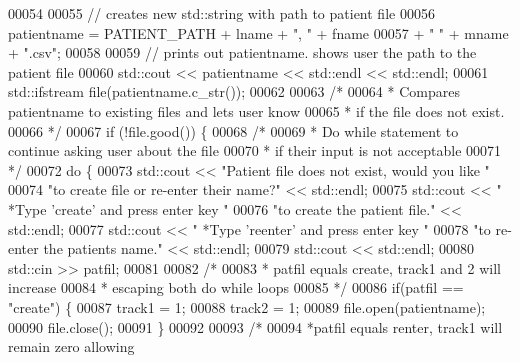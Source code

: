\begin{DoxyCode}
00054 
00055             \textcolor{comment}{// creates new std::string with path to patient file}
00056             patientname = PATIENT\_PATH + lname + \textcolor{stringliteral}{", "} + fname
00057                 + \textcolor{stringliteral}{" "} + mname + \textcolor{stringliteral}{".csv"};
00058 
00059             \textcolor{comment}{// prints out patientname. shows user the path to the patient file}
00060             std::cout << patientname << std::endl << std::endl;
00061             std::ifstream file(patientname.c\_str());
00062 
00063             \textcolor{comment}{/*}
00064 \textcolor{comment}{             * Compares patientname to existing files and lets user know}
00065 \textcolor{comment}{             * if the file does not exist.}
00066 \textcolor{comment}{             */}
00067             \textcolor{keywordflow}{if} (!file.good()) \{
00068                 \textcolor{comment}{/* }
00069 \textcolor{comment}{                 * Do while statement to continue asking user about the file}
00070 \textcolor{comment}{                 * if their input is not acceptable}
00071 \textcolor{comment}{                 */} 
00072                 \textcolor{keywordflow}{do} \{
00073                     std::cout << \textcolor{stringliteral}{"Patient file does not exist, would you like "}
00074                         \textcolor{stringliteral}{"to create file or re-enter their name?"} << std::endl;
00075                     std::cout << \textcolor{stringliteral}{"  *Type 'create' and press enter key "}
00076                         \textcolor{stringliteral}{"to create the patient file."} << std::endl;
00077                     std::cout << \textcolor{stringliteral}{"  *Type 'reenter' and press enter key "}
00078                         \textcolor{stringliteral}{"to re-enter the patients name."} << std::endl;
00079                     std::cout << std::endl;
00080                     std::cin >> patfil;
00081 
00082                     \textcolor{comment}{/* }
00083 \textcolor{comment}{                     * patfil equals create, track1 and 2 will increase}
00084 \textcolor{comment}{                     * escaping both do while loops}
00085 \textcolor{comment}{                     */}
00086                     \textcolor{keywordflow}{if}(patfil == \textcolor{stringliteral}{"create"}) \{
00087                         track1 = 1;
00088                         track2 = 1;
00089                         file.open(patientname);
00090                         file.close();
00091                     \}
00092 
00093                     \textcolor{comment}{/*}
00094 \textcolor{comment}{                    *patfil equals renter, track1 will remain zero allowing}

\end{DoxyCode}
